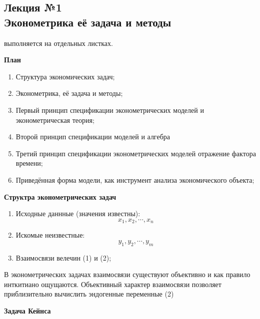 \documentclass[12pt,a4paper]{article}
\author{Аверьянов Тимофей, Корякин Алексей}
\begin{document}
\begin{center}
\section*{Лекция №1 \\
Эконометрика её задача и методы}
\end{center}


 выполняется на отдельных листках.
\begin{center}
\textbf{План}
\end{center}
\begin{enumerate}
\item Структура экономических задач;
\item Эконометрика, её задача и методы;
\item Первый принцип спецификации эконометрических моделей и эконометрическая теория;
\item Второй принцип спецификации моделей и алгебра
\item Третий принцип спецификации эконометрических моделей отражение фактора времени;
\item Приведённая форма модели, как инструмент анализа экономического объекта;
\end{enumerate}
\textbf{Структра эконометрических задач}
\begin{enumerate}
\item Исходные даннные (значения известны): \begin{equation}
x_1, x_2, \cdots, x_n
\end{equation}
\item Искомые неизвестные: \begin{equation}
y_1, y_2, \cdots, y_m
\end{equation}
\item Взаимосвязи велечин (1) и (2);
\end{enumerate}

В эконометрических задачах взаимосвязи существуют объективно и как правило инткитиано ощущаются. Объективный характер взаимосвязи позволяет приблизительно вычислить эндогенные переменные (2)

\textbf{Задача Кейнса}
\end{document}
